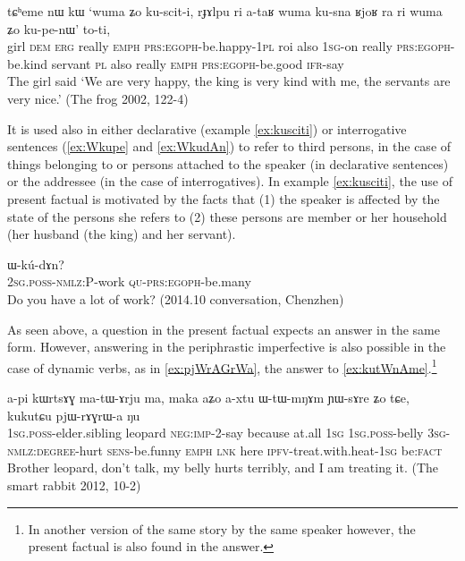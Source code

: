 \documentclass[oldfontcommands,oneside,a4paper,11pt]{article}
\newcommand{\ipa}[1]{{\phon \mbox{#1}}} %
\newcommand{\factual}[1]{\textsc{:fact}}
\begin{document}
 
\begin{exe}
\ex \label{ex:kusciti}
\gll
\ipa{tɕʰeme} 	\ipa{nɯ} 	\ipa{kɯ} 	\ipa{`wuma} 	\ipa{ʑo} 	\ipa{ku-scit-i,} \ipa{rɟɤlpu} 	\ipa{ri} 	\ipa{a-taʁ} 	\ipa{wuma} 	\ipa{ku-sna} \ipa{ʁjoʁ} 	\ipa{ra} 	\ipa{ri} 	\ipa{wuma} 	\ipa{ʑo} 	\ipa{ku-pe-nɯ'} \ipa{to-ti,} \\
girl \textsc{dem} \textsc{erg} really \textsc{emph} \textsc{prs:egoph}-be.happy-\textsc{1pl}  roi also \textsc{1sg}-on really \textsc{prs:egoph}-be.kind servant \textsc{pl} also really \textsc{emph}   \textsc{prs:egoph}-be.good \textsc{ifr}-say \\
\glt The girl said `We are very happy, the king is very kind with me, the servants are very nice.'
(The frog 2002, 122-4)
\end{exe}

It is used also in either declarative (example \ref{ex:kusciti}) or  interrogative sentences (\ref{ex:Wkupe} and \ref{ex:WkudAn}) to refer to third persons, in the case of things belonging to or persons attached to the speaker (in declarative sentences) or the addressee (in the case of interrogatives). In example \ref{ex:kusciti}, the  use of present factual is motivated by the facts that (1) the speaker is affected by the state of the persons she refers to (2) these persons are member or her household (her husband (the king) and her servant).

 
  \begin{exe}
\ex \label{ex:WkudAn}
\gll \ipa{nɤ-kɤ-nɤma} 	\ipa{ɯ-kú-dɤn?}  \\
 \textsc{2sg.poss-nmlz:P}-work \textsc{qu-prs:egoph}-be.many \\
\glt Do you have a lot of work? (2014.10 conversation, Chenzhen)
\end{exe}

As seen above, a question in the present factual expects an answer in the same form. However, answering in the periphrastic imperfective is also possible in the case of dynamic verbs, as in \ref{ex:pjWrAGrWa}, the answer to \ref{ex:kutWnAme}.\footnote{In another version of the same story by the same speaker however, the present factual is also found in the answer.}

 \begin{exe}
\ex \label{ex:pjWrAGrWa}
\gll
 \ipa{a-pi} 	\ipa{kɯrtsɤɣ} 	\ipa{ma-tɯ-ɤrju} 	\ipa{ma,} 	\ipa{maka} 	\ipa{aʑo} 	\ipa{a-xtu} 	\ipa{ɯ-tɯ-mŋɤm} 	\ipa{ɲɯ-sɤre} 	\ipa{ʑo} 	\ipa{tɕe,} 	\ipa{kukutɕu} 	\ipa{pjɯ-rɤɣrɯ-a} 	\ipa{ŋu} 	\\
 \textsc{1sg.poss}-elder.sibling leopard \textsc{neg:imp}-2-say because at.all \textsc{1sg} \textsc{1sg.poss}-belly \textsc{3sg-nmlz:degree}-hurt \textsc{sens}-be.funny \textsc{emph} \textsc{lnk} here \textsc{ipfv}-treat.with.heat-\textsc{1sg} be\factual{}  \\
\glt Brother leopard, don't talk, my belly hurts terribly, and I am treating it. (The smart rabbit 2012, 10-2)
 \end{exe}
 
\end{document}
